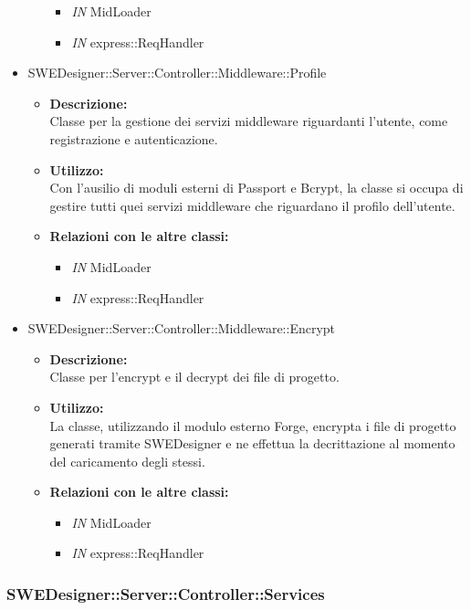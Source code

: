 \begin{itemize}
\begin{itemize}
				\begin{itemize}
					\item \emph{IN} MidLoader
					\item \emph{IN} express::ReqHandler
				\end{itemize}
			\end{itemize}
			\item SWEDesigner::Server::Controller::Middleware::Profile
			\begin{itemize}
				\item \textbf{Descrizione: }\\
				Classe per la gestione dei servizi middleware riguardanti l'utente, come registrazione e autenticazione.
				\item \textbf{Utilizzo: }\\
				Con l'ausilio di moduli esterni di Passport	e Bcrypt, la classe si occupa di gestire tutti quei servizi middleware che riguardano il profilo dell'utente.
				\item \textbf{Relazioni con le altre classi: }
				\begin{itemize}
					\item \emph{IN} MidLoader
					\item \emph{IN} express::ReqHandler
				\end{itemize}
			\end{itemize}
			\item SWEDesigner::Server::Controller::Middleware::Encrypt
			\begin{itemize}
				\item \textbf{Descrizione: }\\
				Classe per l'encrypt e il decrypt dei file di progetto.
				\item \textbf{Utilizzo: }\\
				La classe, utilizzando il modulo esterno Forge, encrypta i file di progetto generati tramite SWEDesigner e ne effettua la decrittazione al momento del caricamento
				degli stessi.
				\item \textbf{Relazioni con le altre classi: }
				\begin{itemize}
					\item \emph{IN} MidLoader
					\item \emph{IN} express::ReqHandler
				\end{itemize}
			\end{itemize}
		\end{itemize}


		\subsubsection{SWEDesigner::Server::Controller::Services}
